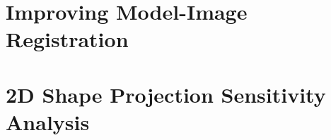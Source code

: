 \section{Improving Model-Image Registration}
\label{sec:new-image-metrics}

\section{2D Shape Projection Sensitivity Analysis}
\label{sec:shape-sensitivity}



